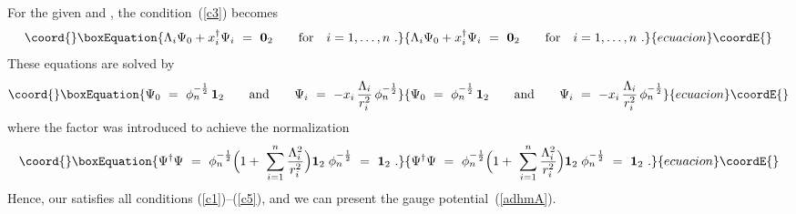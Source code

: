 \documentclass[a4paper,11pt]{article}
\numberwithin{equation}{section}
\def\La{\Lambda}
\def\+{\dagger}
\begin{document}
{For the given \coordHE{} 
and \myHighlight{$x_i:=(x^\mu{-}b_i^\mu)e^\+_\mu$}\coordHE{}, the condition~(\ref{c3}) becomes
\begin{equation}\coord{}\boxEquation{
\La_i\Psi_0 + x_i^\+\Psi_i\ =\ {\bf0}_2 \qquad\textrm{for}\quad i=1,\ldots,n\ .
}{
\La_i\Psi_0 + x_i^\+\Psi_i\ =\ {\bf0}_2 \qquad\textrm{for}\quad i=1,\ldots,n\ .
}{ecuacion}\coordE{}\end{equation}
These equations are solved by
\begin{equation}\coord{}\boxEquation{ \label{Psisol}
\Psi_0\ =\ \phi_n^{-\frac12}\,{\bf1}_2 \qquad\textrm{and}\qquad
\Psi_i\ =\ -x_i\,\frac{\La_i}{r_i^2}\,\phi_n^{-\frac12}
}{ \Psi_0\ =\ \phi_n^{-\frac12}\,{\bf1}_2 \qquad\textrm{and}\qquad
\Psi_i\ =\ -x_i\,\frac{\La_i}{r_i^2}\,\phi_n^{-\frac12}
}{ecuacion}\coordE{}\end{equation}
where the factor \coordHE{} was introduced 
to achieve the normalization
\begin{equation}\coord{}\boxEquation{
\Psi^\+\Psi\ =\ \phi_n^{-\frac12}\Bigl(
1+\ \sum_{i=1}^n\frac{\La_i^2}{r_i^2} \Bigr){\bf1}_2\;\phi_n^{-\frac12}\ 
=\ {\bf1}_2\ .
}{
\Psi^\+\Psi\ =\ \phi_n^{-\frac12}\Bigl(
1+\ \sum_{i=1}^n\frac{\La_i^2}{r_i^2} \Bigr){\bf1}_2\;\phi_n^{-\frac12}\ 
=\ {\bf1}_2\ .
}{ecuacion}\coordE{}\end{equation}
Hence, our \myHighlight{$(\Delta,\Psi)$}\coordHE{} satisfies all conditions (\ref{c1})--(\ref{c5}),
and we can present the gauge potential~(\ref{adhmA}).

\vfill\eject

}
\end{document}

